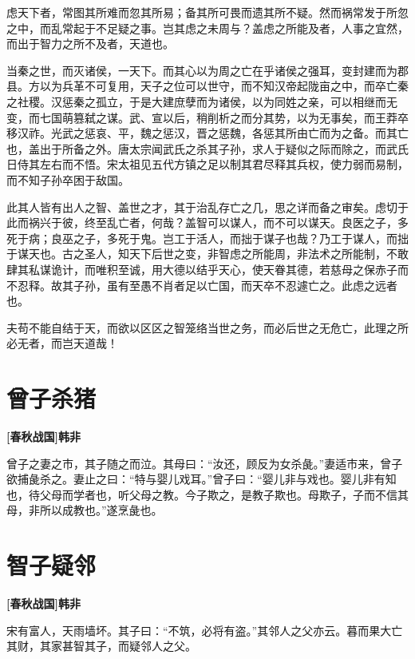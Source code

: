 \documentclass[UTF8,titlepage,oneside]{ctexbook}
\begin{document}
虑天下者，常图其所难而忽其所易；备其所可畏而遗其所不疑。然而祸常发于所忽之中，而乱常起于不足疑之事。岂其虑之未周与？盖虑之所能及者，人事之宜然，而出于智力之所不及者，天道也。


当秦之世，而灭诸侯，一天下。而其心以为周之亡在乎诸侯之强耳，变封建而为郡县。方以为兵革不可复用，天子之位可以世守，而不知汉帝起陇亩之中，而卒亡秦之社稷。汉惩秦之孤立，于是大建庶孽而为诸侯，以为同姓之亲，可以相继而无变，而七国萌篡弑之谋。武、宣以后，稍削析之而分其势，以为无事矣，而王莽卒移汉祚。光武之惩哀、平，魏之惩汉，晋之惩魏，各惩其所由亡而为之备。而其亡也，盖出于所备之外。唐太宗闻武氏之杀其子孙，求人于疑似之际而除之，而武氏日侍其左右而不悟。宋太祖见五代方镇之足以制其君尽释其兵权，使力弱而易制，而不知子孙卒困于敌国。


此其人皆有出人之智、盖世之才，其于治乱存亡之几，思之详而备之审矣。虑切于此而祸兴于彼，终至乱亡者，何哉？盖智可以谋人，而不可以谋天。良医之子，多死于病；良巫之子，多死于鬼。岂工于活人，而拙于谋子也哉？乃工于谋人，而拙于谋天也。古之圣人，知天下后世之变，非智虑之所能周，非法术之所能制，不敢肆其私谋诡计，而唯积至诚，用大德以结乎天心，使天眷其德，若慈母之保赤子而不忍释。故其子孙，虽有至愚不肖者足以亡国，而天卒不忍遽亡之。此虑之远者也。


夫苟不能自结于天，而欲以区区之智笼络当世之务，而必后世之无危亡，此理之所必无者，而岂天道哉！



\chapter*{曾子杀猪}
\begin{center}
	\textbf{[春秋战国]韩非}
\end{center}

曾子之妻之市，其子随之而泣。其母曰：“汝还，顾反为女杀彘。”妻适市来，曾子欲捕彘杀之。妻止之曰：“特与婴儿戏耳。”曾子曰：“婴儿非与戏也。婴儿非有知也，待父母而学者也，听父母之教。今子欺之，是教子欺也。母欺子，子而不信其母，非所以成教也。”遂烹彘也。


\chapter*{智子疑邻}
\begin{center}
	\textbf{[春秋战国]韩非}
\end{center}

宋有富人，天雨墙坏。其子曰：“不筑，必将有盗。”其邻人之父亦云。暮而果大亡其财，其家甚智其子，而疑邻人之父。
\end{document}
